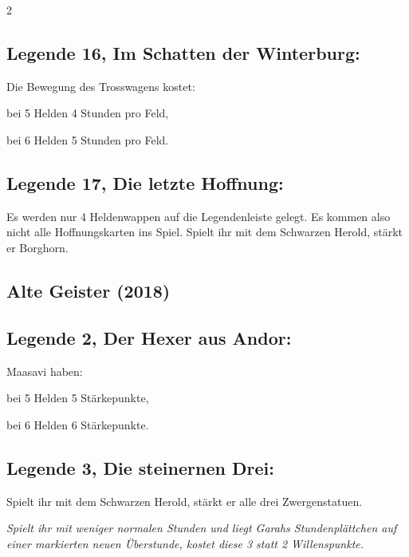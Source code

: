 \documentclass[10pt, a4paper, oneside]{book}
\newcommand{\fan}[1]{\textit{#1}}
\begin{document}
\begin{multicols*}{2}
\begin{bgcolor}
\subsection{Legende 16, Im Schatten der Winterburg:}

Die Bewegung des Trosswagens kostet:
\supercite{dh16-a2-5-6,mh-dlh-5-6}

\bullet{} bei 5 Helden 4 Stunden pro Feld,

\bullet{} bei 6 Helden 5 Stunden pro Feld.




\subsection{Legende 17, Die letzte Hoffnung:}

Es werden nur 4 Heldenwappen auf die Legendenleiste gelegt. Es kommen also nicht alle Hoffnungskarten ins Spiel.
\supercite{dh17-a0-5-6,mh-dlh-5-6}
Spielt ihr mit dem Schwarzen Herold, stärkt er Borghorn.
\supercite{dh17-a0-5-6}

\end{bgcolor}



\begin{bgcolor}[color-ag]
\section{Alte Geister (2018)}


\subsection{Legende 2, Der Hexer aus Andor:}

Maasavi haben:
\supercite{ag-begleitheft}

\bullet{} bei 5 Helden 5 Stärkepunkte,

\bullet{} bei 6 Helden 6 Stärkepunkte.


\subsection{Legende 3, Die steinernen Drei:}

Spielt ihr mit dem Schwarzen Herold, stärkt er alle drei Zwergenstatuen.
\supercite{ag-begleitheft}

\fan{Spielt ihr mit weniger normalen Stunden und liegt Garahs Stundenplättchen auf einer markierten neuen Überstunde, kostet diese 3 statt 2 Willenspunkte.}


\end{bgcolor}
\end{multicols*}
\end{document}

